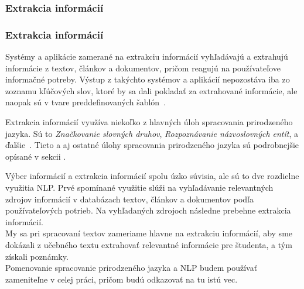 %
%
{
	\subsubsection{Extrakcia informácií}
}
{
	\subsubsection{Extrakcia informácií}
}
\label{subsubsec:information_extraction}
Systémy a aplikácie zamerané na extrakciu informácií vyhľadávajú a extrahujú informácie z textov, článkov a dokumentov, pričom reagujú na používateľove informačné potreby. Výstup z takýchto systémov a aplikácií nepozostáva iba zo zoznamu kľúčových slov, ktoré by sa dali pokladať za extrahované informácie, ale naopak sú v tvare preddefinovaných šablón~\cite{Preeti}.

Extrakcia informácií využíva niekoľko z hlavných úloh spracovania prirodzeného jazyka. Sú to \textit{Značkovanie slovných druhov}, \textit{Rozpoznávanie názvoslovných entít}, a ďalšie~\cite{Preeti}. Tieto a aj ostatné úlohy spracovania prirodzeného jazyka sú podrobnejšie opísané v sekcii .

Výber informácií a extrakcia informácií spolu úzko súvisia, ale sú to dve rozdielne využitia NLP. Prvé spomínané využitie slúži na vyhľadávanie relevantných zdrojov informácií v databázach textov, článkov a dokumentov podľa používateľových potrieb. Na vyhľadaných zdrojoch následne prebehne extrakcia informácií. 
\\

My sa pri spracovaní textov zameriame hlavne na extrakciu informácií, aby sme dokázali z učebného textu extrahovať relevantné informácie pre študenta, a tým získali poznámky.
\\

Pomenovanie spracovanie prirodzeného jazyka a NLP budem používať zameniteľne v celej práci, pričom budú odkazovať na tu istú vec.

